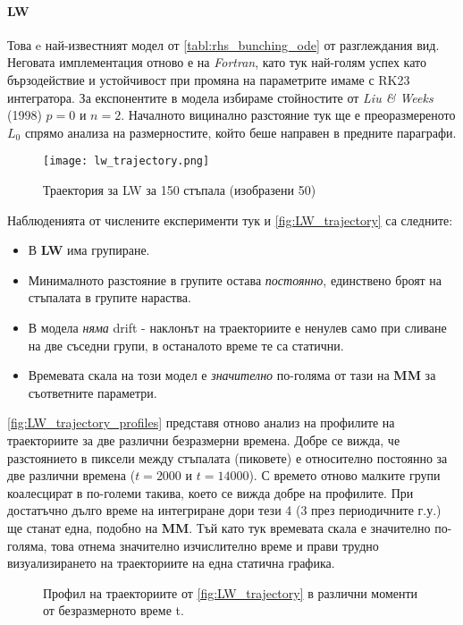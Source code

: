 \paragraph{LW} Това e най-известният модел от \autoref{tabl:rhs_bunching_ode} от разглеждания вид. Неговата имплементация отново е на \textit{Fortran}, като тук най-голям успех като бързодействие и устойчивост при промяна на параметрите имаме с RK23 интегратора. За експонентите в модела избираме стойностите от \textit{Liu \& Weeks} (1998) \cite{Liu1998} $p = 0$ и $n = 2$. Началното вицинално разстояние тук ще е преоразмереното $L_0$ спрямо анализа на размерностите, който беше направен в предните параграфи.
\begin{figure}[htbp]
	\centering
	\texttt{[image: lw\_trajectory.png]}
	\caption{Траектория за LW за 150 стъпала (изобразени 50)}
	\label{fig:LW_trajectory}
\end{figure}
Наблюденията от числените експерименти тук и \autoref{fig:LW_trajectory} са следните: 
\begin{itemize}
    \item В \textbf{LW} има групиране.
    \item Минималното разстояние в групите остава \textit{постоянно}, единствено броят на стъпалата в групите нараства.
    \item В модела \textit{няма} drift - наклонът на траекториите е ненулев само при сливане на две съседни групи, в останалото време те са статични.
    \item Времевата скала на този модел е \textit{значително} по-голяма от тази на \textbf{MM} за съответните параметри.
\end{itemize}
\autoref{fig:LW_trajectory_profiles} представя отново анализ на профилите на траекториите за две различни безразмерни времена. Добре се вижда, че разстоянието в пиксели между стъпалата (пиковете) е относително постоянно за две различни времена ($t = 2000$ и $t = 14000$). С времето отново малките групи коалесцират в по-големи такива, което се вижда добре на профилите. При достатъчно дълго време на интегриране дори тези 4 (3 през периодичните г.у.) ще станат една, подобно на \textbf{MM}. Тъй като тук времевата скала е значително по-голяма, това отнема значително изчислително време и прави трудно визуализирането на траекториите на една статична графика.
\begin{figure}[hbpt]
    \centering
    \caption{Профил на траекториите от \autoref{fig:LW_trajectory} в различни моменти от безразмерното време t.}
    \label{fig:LW_trajectory_profiles}
\end{figure}

